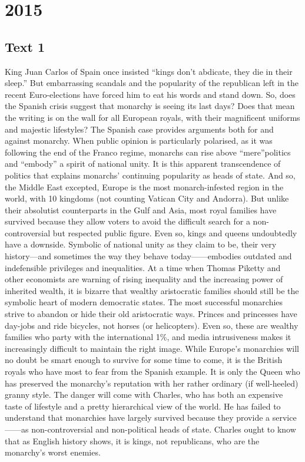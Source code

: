   
\section{2015}
\subsection{Text 1}
    King Juan Carlos of Spain once insisted “kings don’t abdicate, they die in their sleep.” But embarrassing scandals and the popularity of the republican left in the recent Euro-elections have forced him to eat his words and stand down. So, does the Spanish crisis suggest that monarchy is seeing its last days? Does that mean the writing is on the wall for all European royals, with their magnificent uniforms and majestic lifestyles?
    The Spanish case provides arguments both for and against monarchy. When public opinion is particularly polarised, as it was following the end of the Franco regime, monarchs can rise above “mere”politics and “embody” a spirit of national unity.
     It is this apparent transcendence of politics that explains monarchs’ continuing popularity as heads of state. And so, the Middle East excepted, Europe is the most monarch-infested region in the world, with 10 kingdoms (not counting Vatican City and Andorra). But unlike their absolutist counterparts in the Gulf and Asia, most royal families have survived because they allow voters to avoid the difficult search for a non-controversial but respected public figure.
    Even so, kings and queens undoubtedly have a downside. Symbolic of national unity as they claim to be, their very history—and sometimes the way they behave today——embodies outdated and indefensible privileges and inequalities. At a time when Thomas Piketty and other economists are warning of rising inequality and the increasing power of inherited wealth, it is bizarre that wealthy aristocratic families should still be the symbolic heart of modern democratic states.
    The most successful monarchies strive to abandon or hide their old aristocratic ways. Princes and princesses have day-jobs and ride bicycles, not horses (or helicopters). Even so, these are wealthy families who party with the international 1\%, and media intrusiveness makes it increasingly difficult to maintain the right image.
    While Europe’s monarchies will no doubt be smart enough to survive for some time to come, it is the British royals who have most to fear from the Spanish example.
     It is only the Queen who has preserved the monarchy’s reputation with her rather ordinary (if well-heeled) granny style. The danger will come with Charles, who has both an expensive taste of lifestyle and a pretty hierarchical view of the world. He has failed to understand that monarchies have largely survived because they provide a service——as non-controversial and non-political heads of state. Charles ought to know that as English history shows, it is kings, not republicans, who are the monarchy’s worst enemies.
